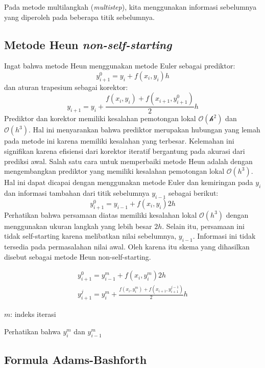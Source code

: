 Pada metode multilangkah (\textit{multistep}), kita menggunakan informasi sebelumnya
yang diperoleh pada beberapa titik sebelumnya.

\subsection*{Metode Heun \textit{non-self-starting}}

Ingat bahwa metode Heun menggunakan metode Euler sebagai prediktor:
\begin{equation*}
y_{i+1}^{0} = y_{i} + f(x_i, y_i) h
\end{equation*}
dan aturan trapesium sebagai korektor:
\begin{equation*}
y_{i+1} = y_{i} + \frac{f(x_i,y_i) + f(x_{i+1},y^{0}_{i+1})}{2} h 
\end{equation*}
Prediktor dan korektor memiliki kesalahan pemotongan lokal $\mathcal{O(h^2)}$
dan $\mathcal{O}(h^3)$. Hal ini menyarankan bahwa prediktor merupakan
hubungan yang lemah pada metode ini karena memiliki kesalahan yang terbesar.
Kelemahan ini signifikan karena efisiensi dari korektor iteratif bergantung
pada akurasi dari prediksi awal.
Salah satu cara untuk memperbaiki metode Heun adalah dengan mengembangkan prediktor
yang memiliki kesalahan pemotongan lokal $\mathcal{O}(h^3)$.
Hal ini dapat dicapai dengan menggunakan metode Euler dan kemiringan pada $y_i$ dan
informasi tambahan dari titik sebelumnya $y_{i-1}$ sebagai berikut:
\begin{equation*}
y^{0}_{i+1} = y_{i-1} + f(x_i, y_i)2h
\end{equation*}
Perhatikan bahwa persamaan diatas memiliki kesalahan lokal $\mathcal{O}(h^3)$
dengan menggunakan ukuran langkah yang lebih besar $2h$. Selain itu, persamaan
ini tidak self-starting karena melibatkan nilai sebelumnya, $y_{i-1}$.
Informasi ini tidak tersedia pada permasalahan nilai awal. Oleh karena itu
skema yang dihasilkan disebut sebagai metode Heun non-self-starting.

\begin{align*}
y^{0}_{i+1} = y^{m}_{i-1} + f(x_i,y^{m}_i)2h \\
y^{j}_{i+1} = y^{m}_{i} + \frac{f(x_i,y^{m}_i) + f(x_{i+1},y^{j-1}_{i+1})}{2} h 
\end{align*}

$m$: indeks iterasi

Perhatikan bahwa $y^{m}_{i}$ dan $y^{m}_{i-1}$


\subsection*{Formula Adams-Bashforth}

